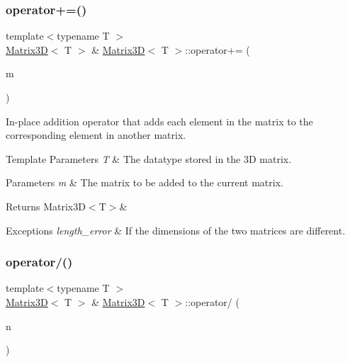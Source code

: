 \subsubsection{\texorpdfstring{operator+=()}{operator+=()}}
{\footnotesize\ttfamily template$<$typename T $>$ \\
\mbox{\hyperlink{classMatrix3D}{Matrix3D}}$<$ T $>$ \& \mbox{\hyperlink{classMatrix3D}{Matrix3D}}$<$ T $>$\+::operator+= (\begin{DoxyParamCaption}\item[{const \mbox{\hyperlink{classMatrix3D}{Matrix3D}}$<$ T $>$ \&}]{m }\end{DoxyParamCaption})}



In-\/place addition operator that adds each element in the matrix to the corresponding element in another matrix. 


\begin{DoxyTemplParams}{Template Parameters}
{\em T} & The datatype stored in the 3D matrix. \\
\hline
\end{DoxyTemplParams}

\begin{DoxyParams}{Parameters}
{\em m} & The matrix to be added to the current matrix.\\
\hline
\end{DoxyParams}
\begin{DoxyReturn}{Returns}
Matrix3\+D$<$\+T$>$\&
\end{DoxyReturn}

\begin{DoxyExceptions}{Exceptions}
{\em length\+\_\+error} & If the dimensions of the two matrices are different. \\
\hline
\end{DoxyExceptions}
\mbox{\label{classMatrix3D_ad45bff7f2159a4ba0aa4546635e8a73f}} 
\subsubsection{\texorpdfstring{operator/()}{operator/()}}
{\footnotesize\ttfamily template$<$typename T $>$ \\
\mbox{\hyperlink{classMatrix3D}{Matrix3D}}$<$ T $>$ \& \mbox{\hyperlink{classMatrix3D}{Matrix3D}}$<$ T $>$\+::operator/ (\begin{DoxyParamCaption}\item[{const double}]{n }\end{DoxyParamCaption})}



